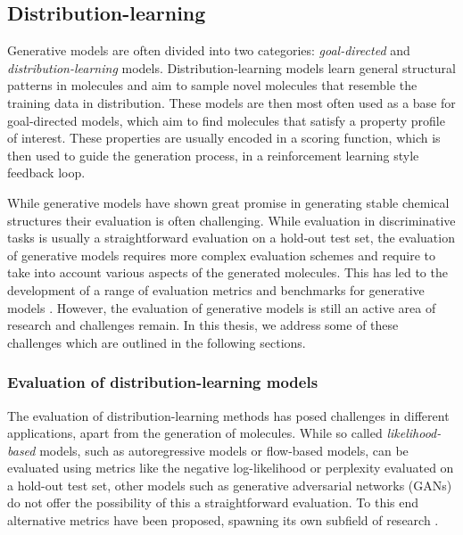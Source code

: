 \subsection{Distribution-learning}
Generative models are often divided into two categories: \emph{goal-directed}
and \emph{distribution-learning} models. Distribution-learning models learn
general structural patterns in molecules and aim to sample novel molecules that
resemble the training data in distribution. These models are then most often
used as a base for goal-directed models, which aim to find molecules that
satisfy a property profile of interest. These properties are usually encoded in
a scoring function, which is then used to guide the generation process, in a
reinforcement learning style feedback loop.

While generative models have shown great promise in generating stable chemical
structures their evaluation is often challenging. While evaluation in
discriminative tasks is usually a straightforward evaluation on a hold-out test
set, the evaluation of generative models requires more complex evaluation
schemes and require to take into account various aspects of the generated
molecules. This has led to the development of a range of evaluation metrics
\citep{preuerFrechetChemNetDistance2018,gaoSynthesizabilityMoleculesProposed2020}
and benchmarks for generative models
\citep{polykovskiyMolecularSetsMOSES2020,brownGuacaMolBenchmarkingModels2019}.
However, the evaluation of generative models is still an active area of research
and challenges remain. In this thesis, we address some of these challenges which
are outlined in the following sections.

\subsubsection{Evaluation of distribution-learning models}
The evaluation of distribution-learning methods has posed challenges in
different applications, apart from the generation of molecules. While so called
\emph{likelihood-based} models, such as autoregressive models or flow-based
models, can be evaluated using metrics like the negative log-likelihood or
perplexity evaluated on a hold-out test set, other models such as generative
adversarial networks (GANs) \citep{goodfellowGenerativeAdversarialNetworks2014}
do not offer the possibility of this a straightforward evaluation. To this end
alternative metrics have been proposed, spawning its own subfield of research
\citep{heuselGANsTrainedTwo2017}.

